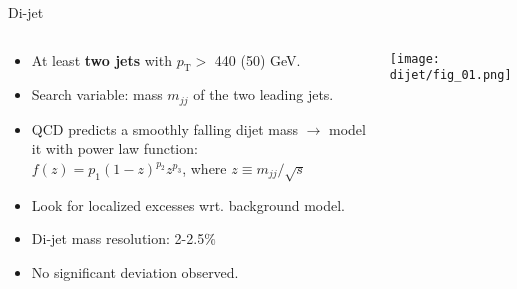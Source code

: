 \documentclass[8pt]{beamer}
\begin{document}
\begin{frame}{\large Di-jet}
\begin{columns}
 \begin{column}{6cm}
    \begin{itemize}
      \item At least \textbf{two jets} with $p_\mathrm{T}>$ 440 (50) GeV.
      \vspace{0.2cm}
      \item Search variable: mass $m_{jj}$ of the two leading jets.
      \vspace{0.2cm}
      \item QCD predicts a smoothly falling dijet mass $\rightarrow$ model it with power law function: \\
      \vspace{0.1cm}
      $f(z)=p_{1}(1-z)^{p_{2}}z^{p_{3}}$, where $z \equiv m_{jj}/\sqrt{s}$
      \vspace{0.2cm}
      \item Look for localized excesses wrt. background model.
      \vspace{0.2cm}
      \item Di-jet mass resolution: 2-2.5$\%$
      \vspace{0.2cm}
      \item No significant deviation observed.
    \end{itemize}
 \end{column}
 \begin{column}{6cm}
  \texttt{[image: dijet/fig\_01.png]}\\
 \end{column}
\end{columns}
\end{frame}
\end{document}
